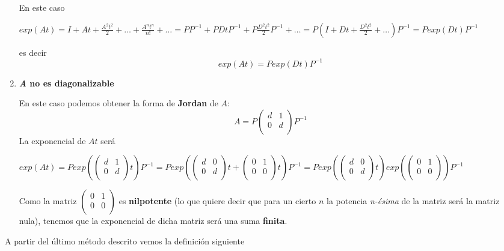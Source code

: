 \begin{enumerate}
En este caso 
\begin{center}
$exp(At) = I + At + \frac{A^2t^2}{2} + \hdots +\frac{A^nt^n}{n!} + \hdots =PP^{-1} + PDtP^{-1} + P\frac{D^2t^2}{2}P^{-1} + \hdots = P(I+Dt+\frac{D^2t^2}{2}+\hdots)P^{-1} = Pexp(Dt)P^{-1}$
\end{center}
es decir
$$exp(At) = Pexp(Dt)P^{-1}$$

\item \textbf{\textit{A} no es diagonalizable}

En este caso podemos obtener la forma de \textbf{Jordan} de $A$:
$$A = P\begin{pmatrix}
d & 1\\0 & d\\
\end{pmatrix}P^{-1}$$
La exponencial de $At$ será
\begin{center}
$exp(At) = Pexp({\begin{pmatrix}
d & 1\\0 & d\\
\end{pmatrix}t})P^{-1} = Pexp({\begin{pmatrix}
d & 0\\0 & d\\
\end{pmatrix}t + \begin{pmatrix}
0 & 1\\ 0 & 0\\
\end{pmatrix}}t)P^{-1} = Pexp(\begin{pmatrix}
d & 0\\ 0 & d\\
\end{pmatrix}t)exp(\begin{pmatrix}
0 & 1\\ 0 & 0\\
\end{pmatrix})P^{-1}$
\end{center}
Como la matriz $\begin{pmatrix}
0 & 1\\ 0 & 0\\
\end{pmatrix}$ es \textbf{nilpotente} (lo que quiere decir que para un cierto $n$ la potencia \textit{n-ésima} de la matriz será la matriz nula), tenemos que la exponencial de dicha matriz será una suma \textbf{finita}.
\end{enumerate}

A partir del último método descrito vemos la definición siguiente

